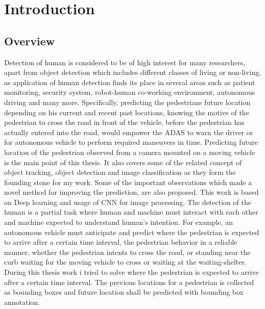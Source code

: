 \pagestyle{fancy}
\fancyhf{}
\fancyhead[EL]{\leftmark} %
\fancyhead[OL]{\leftmark}
\fancyhead[ER,OR]{\thepage}

\setcounter{page}{1}

\chapter{Introduction}
\section{Overview}
Detection of human is considered to be of high interest for many researchers, apart from object detection which includes different classes of living or non-living, as application of human detection finds its place in several areas such as patient monitoring, security system, robot-human co-working environment, autonomous driving and many more. Specifically, predicting the pedestrians future 
location depending on his current and recent past locations, knowing the motive of the pedestrian to cross the road in front of the vehicle, before the pedestrian has actually entered into the road, would empower the ADAS to warn the driver or for autonomous vehicle to perform required maneuvers in time.
Predicting future location of the pedestrian observed from a camera mounted on a moving vehicle is the main point of this thesis. It also covers some of the related concept of object tracking, object detection and image classification as they form the founding stone for my work. Some of the important observations which made a novel method for improving
the prediction, are also proposed. This work is based on Deep learning and usage of CNN for image processing. The detection of the human is a partial task where human and machine must interact with each other and machine expected to understand human's intention. For example, an autonomous vehicle must anticipate and predict where the pedestrian is expected to arrive after a certain time interval, the pedestrian behavior in a reliable manner, whether the pedestrian intents to cross the road, or standing near the curb waiting for the moving vehicle to cross or waiting at the waiting-shelter. During this thesis work i tried to solve where the pedestrian is expected to arrive after a certain time interval. The previous locations for a pedestrian is collected as bounding boxes and future location shall be predicted with bounding box annotation.

